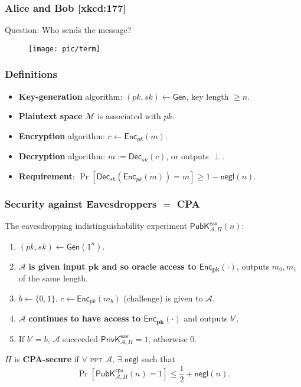 \begin{frame}\frametitle{Alice and Bob [xkcd:177]}
Question: Who sends the message?
\begin{figure}
\begin{center}
\texttt{[image: pic/term]} 
\end{center}
\end{figure}
\end{frame}
\begin{frame}\frametitle{Definitions}
\begin{figure}
\begin{center}

\end{center}
\end{figure}
\begin{itemize}
\item \textbf{Key-generation} algorithm: $(pk,sk) \gets \mathsf{Gen}$, key length $\ge n$.
\item  \textbf{Plaintext space} $\mathcal{M}$ is associated with $pk$.
\item \textbf{Encryption} algorithm: $c \gets \mathsf{Enc}_{pk}(m)$.
\item \textbf{Decryption} algorithm: $m:= \mathsf{Dec}_{sk}(c)$, or outputs $\perp$.
\item \textbf{Requirement}: $\Pr[\mathsf{Dec}_{sk}(\mathsf{Enc}_{pk}(m)) = m] \ge 1 - \mathsf{negl}(n)$.
\end{itemize}
\end{frame}
\begin{frame}\frametitle{Security against Eavesdroppers $=$ CPA}
The eavesdropping indistinguishability experiment $\mathsf{PubK}^{\mathsf{eav}}_{\mathcal{A},\Pi}(n)$:
\begin{enumerate}
\item $(pk,sk) \gets \mathsf{Gen}(1^n)$.
\item $\mathcal{A}$ \textbf{is given input $\mathbf{pk}$ and so oracle access to $\mathbf{\mathsf{Enc}_{pk}(\cdot)}$}, outputs $m_0, m_1$ of the same length. 
\item $b \gets \{0,1\}$. $c \gets \mathsf{Enc}_{pk}(m_b)$ (challenge) is given to $\mathcal{A}$.
\item $\mathcal{A}$ \textbf{continues to have access to $\mathbf{\mathsf{Enc}_{pk}(\cdot)}$} and outputs $b'$.
\item If $b' = b$, $\mathcal{A}$ succeeded $\mathsf{PrivK}^{\mathsf{eav}}_{\mathcal{A},\Pi}=1$, otherwise 0.
\end{enumerate}
\begin{definition}
$\Pi$ is \textbf{CPA-secure} if $\forall$ \textsc{ppt} $\mathcal{A}$, $\exists$ $\mathsf{negl}$ such that
\[ \Pr\left[\mathsf{PubK}^{\mathsf{cpa}}_{\mathcal{A},\Pi}(n)=1\right] \le \frac{1}{2} + \mathsf{negl}(n). \]
\end{definition}
\end{frame}
